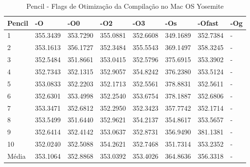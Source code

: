 \begin{table}[!ht]
\centering
\caption{Pencil - Flags de Otimização da Compilação no Mac OS Yosemite}
\label{tab:otimizacao_compilacao:mac:pencil}
\begin{tabular}{llllllll}
\textbf{Pencil}         & \textbf{-O}  & \textbf{-O0}   & \textbf{-O2} & \textbf{-O3} & \textbf{-Os} & \textbf{-Ofast} & \textbf{-Og} \\ \toprule
1                       & 355.3439     &   353.7290     &    355.0881  &    352.6608  &   349.1689   &   352.7384      &  -           \\ 
2                       & 353.1613     &   356.1727     &    352.3484  &    355.5543  &   369.1497   &   358.3245      &  -           \\ 
3                       & 352.5484     &   351.8661     &    353.0415  &    352.5796  &   375.6915   &   353.3902      &  -           \\ 
4                       & 352.7343     &   352.1315     &    352.9057  &    354.8242  &   376.2380   &   353.5124      &  -           \\ 
5                       & 353.0833     &   352.2203     &    352.1713  &    352.5561  &   378.8831   &   352.5611      &  -           \\ 
6                       & 352.6301     &   353.4998     &    352.2540  &    353.6754  &   378.1887   &   352.6806      &  -           \\ 
7                       & 353.3471     &   352.6812     &    352.2950  &    352.3423  &   357.7742   &   352.1714      &  -           \\ 
8                       & 353.5499     &   351.6440     &    352.9621  &    354.2137  &   354.8617   &   353.5657      &  -           \\ 
9                       & 352.6414     &   352.4142     &    353.0637  &    352.8731  &   356.9490   &   381.1381      &  -           \\ 
10                      & 352.0240     &   352.5088     &    354.2621  &    352.7468  &   351.7314   &   353.2352      &  -           \\ \bottomrule
Média                   & 353.1064     &   352.8868     &    353.0392  &    353.4026  &   364.8636   &   356.3318      &  -           \\ 
\end{tabular}
\end{table}

